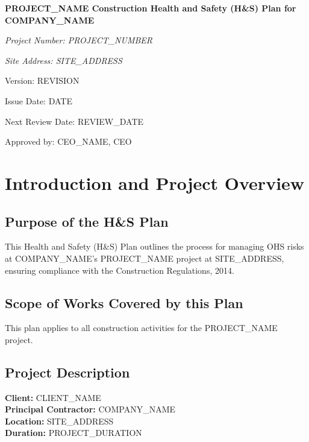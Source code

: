\documentclass[12pt]{article}
\begin{document}
\begin{titlepage}
    \centering
    \vspace*{2cm}
    {\LARGE\bfseries {{PROJECT_NAME}} Construction Health and Safety (H\&S) Plan for {{COMPANY_NAME}}\par}
    \vspace{1cm}
    {\large\itshape Project Number: {{PROJECT_NUMBER}}\par}
    \vspace{0.5cm}
    {\large\itshape Site Address: {{SITE_ADDRESS}}\par}
    \vspace{0.5cm}
    {\normalsize Version: {{REVISION}}\par}
    \vspace{0.5cm}
    {\normalsize Issue Date: {{DATE}}\par}
    \vspace{0.5cm}
    {\normalsize Next Review Date: {{REVIEW_DATE}}\par}
    \vspace{2cm}
    {\normalsize Approved by: {{CEO_NAME}}, CEO\par}
\end{titlepage}

\section{Introduction and Project Overview}

\subsection{Purpose of the H\&S Plan}
This Health and Safety (H\&S) Plan outlines the process for managing OHS risks at {{COMPANY_NAME}}'s {{PROJECT_NAME}} project at {{SITE_ADDRESS}}, ensuring compliance with the Construction Regulations, 2014.

\subsection{Scope of Works Covered by this Plan}
This plan applies to all construction activities for the {{PROJECT_NAME}} project.

\subsection{Project Description}
\textbf{Client:} {{CLIENT_NAME}}\\
\textbf{Principal Contractor:} {{COMPANY_NAME}}\\
\textbf{Location:} {{SITE_ADDRESS}}\\
\textbf{Duration:} {{PROJECT_DURATION}}
\end{document}

